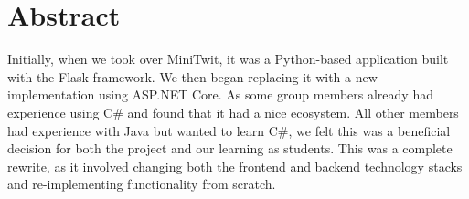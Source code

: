 \documentclass[12pt,a4paper,reqno]{report}
\begin{document}
     
    \clearpage
    \tableofcontents

    \setcounter{page}{0}
    \clearpage 

    \section{Abstract}
    Initially, when we took over MiniTwit, it was a Python-based application built with the Flask framework. We then began replacing it with a new implementation using ASP.NET Core. As some group members already had experience using C# and found that it had a nice ecosystem. All other members had experience with Java but wanted to learn C#, we felt this was a beneficial decision for both the project and our learning as students. This was a complete rewrite, as it involved changing both the frontend and backend technology stacks and re-implementing functionality from scratch. 
    \printbibliography[heading=none]
\end{document}
